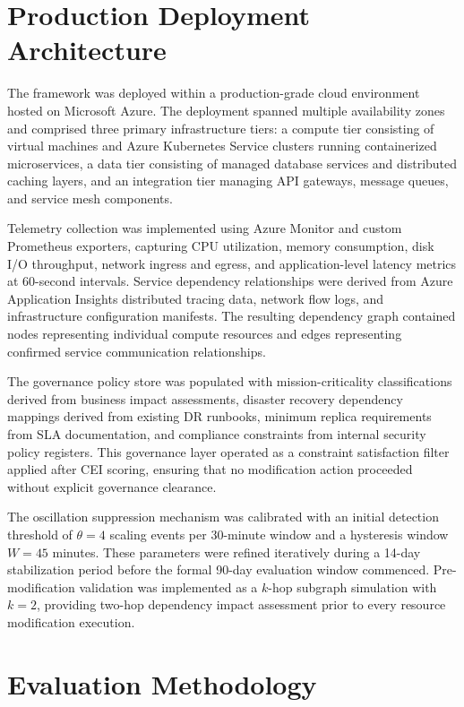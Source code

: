 \documentclass[runningheads]{llncs}
\begin{document}
\section{Production Deployment Architecture}
\label{sec:architecture}

The framework was deployed within a production-grade cloud environment hosted on Microsoft Azure. The deployment spanned multiple availability zones and comprised three primary infrastructure tiers: a compute tier consisting of virtual machines and Azure Kubernetes Service clusters running containerized microservices, a data tier consisting of managed database services and distributed caching layers, and an integration tier managing API gateways, message queues, and service mesh components.

Telemetry collection was implemented using Azure Monitor and custom Prometheus exporters, capturing CPU utilization, memory consumption, disk I/O throughput, network ingress and egress, and application-level latency metrics at 60-second intervals. Service dependency relationships were derived from Azure Application Insights distributed tracing data, network flow logs, and infrastructure configuration manifests. The resulting dependency graph contained nodes representing individual compute resources and edges representing confirmed service communication relationships.

The governance policy store was populated with mission-criticality classifications derived from business impact assessments, disaster recovery dependency mappings derived from existing DR runbooks, minimum replica requirements from SLA documentation, and compliance constraints from internal security policy registers. This governance layer operated as a constraint satisfaction filter applied after CEI scoring, ensuring that no modification action proceeded without explicit governance clearance.

The oscillation suppression mechanism was calibrated with an initial detection threshold of $\theta = 4$ scaling events per 30-minute window and a hysteresis window $W = 45$ minutes. These parameters were refined iteratively during a 14-day stabilization period before the formal 90-day evaluation window commenced. Pre-modification validation was implemented as a $k$-hop subgraph simulation with $k = 2$, providing two-hop dependency impact assessment prior to every resource modification execution.

\section{Evaluation Methodology}
\label{sec:methodology}
\end{document}
